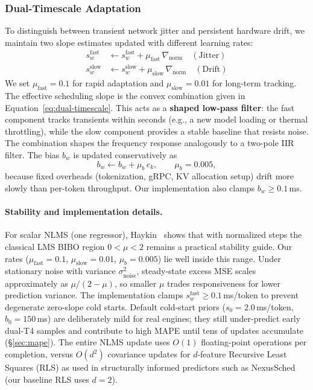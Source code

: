 \documentclass[10pt,twocolumn,letterpaper]{article}
\begin{document}
\subsubsection{Dual-Timescale Adaptation}
To distinguish between transient network jitter and persistent hardware drift, we maintain two slope estimates updated with different learning rates:
\begin{align}
    s^{\text{fast}}_w &\leftarrow s^{\text{fast}}_w + \mu_{\text{fast}} \,\nabla_{\text{norm}} \quad (\text{Jitter}) \\
    s^{\text{slow}}_w &\leftarrow s^{\text{slow}}_w + \mu_{\text{slow}} \,\nabla_{\text{norm}} \quad (\text{Drift})
\end{align}
We set $\mu_{\text{fast}} = 0.1$ for rapid adaptation and $\mu_{\text{slow}} = 0.01$ for long-term tracking. The effective scheduling slope is the convex combination given in Equation~\ref{eq:dual-timescale}.
This acts as a \textbf{shaped low-pass filter}: the fast component tracks transients within seconds (e.g., a new model loading or thermal throttling), while the slow component provides a stable baseline that resists noise. The combination shapes the frequency response analogously to a two-pole IIR filter. The bias $b_w$ is updated conservatively as
\begin{equation}
    b_w \leftarrow b_w + \mu_b \, e_k, \qquad \mu_b = 0.005,
\end{equation}
because fixed overheads (tokenization, gRPC, KV allocation setup) drift more slowly than per-token throughput. Our implementation also clamps $b_w \ge 0.1$\,ms.

\paragraph{Stability and implementation details.}
For scalar NLMS (one regressor), Haykin~\cite{haykin2002adaptive} shows that with normalized steps the classical LMS BIBO region $0 < \mu < 2$ remains a practical stability guide. Our rates ($\mu_{\text{fast}}{=}0.1$, $\mu_{\text{slow}}{=}0.01$, $\mu_b{=}0.005$) lie well inside this range. Under stationary noise with variance $\sigma^2_{\text{noise}}$, steady-state excess MSE scales approximately as $\mu/(2{-}\mu)$, so smaller $\mu$ trades responsiveness for lower prediction variance.
The implementation clamps $s^{\text{fast}}_w \geq 0.1$\,ms/token to prevent degenerate zero-slope cold starts. Default cold-start priors ($s_0{=}2.0$\,ms/token, $b_0{=}150$\,ms) are deliberately mild for real engines; they still under-predict early dual-T4 samples and contribute to high MAPE until tens of updates accumulate (\S\ref{sec:mape}). The entire NLMS update uses $O(1)$ floating-point operations per completion, versus $O(d^2)$ covariance updates for $d$-feature Recursive Least Squares (RLS) as used in structurally informed predictors such as NexusSched~\cite{nexussched} (our baseline RLS uses $d{=}2$).
\end{document}

